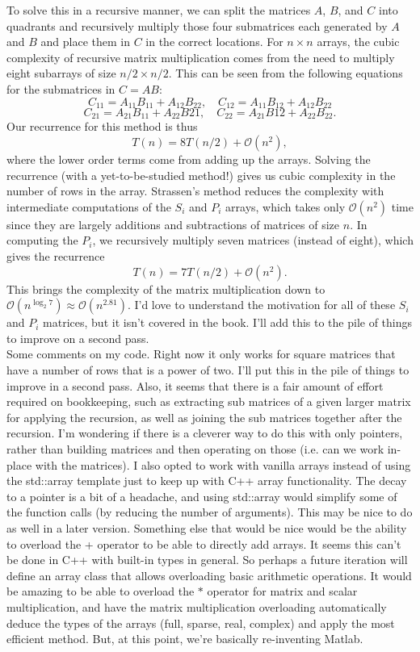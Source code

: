 \documentclass[12pt,english]{article}
\begin{document}
To solve this in a recursive manner, we can split the matrices $A$, $B$, and $C$ into quadrants and recursively multiply those four submatrices each generated by $A$ and $B$ and place them in $C$ in the correct locations.   For $n \times n$ arrays, the cubic complexity of recursive matrix multiplication comes from the need to multiply eight subarrays of size $n/2 \times n/2$.  This can be seen from the following equations for the submatrices in $C = AB$:
$$
C_{11} = A_{11}B_{11} + A_{12}B_{22}, \quad C_{12} = A_{11}B_{12} + A_{12}B_{22}
$$
$$
C_{21} = A_{21}B_{11} + A_{22}B{21}, \quad C_{22} = A_{21}B{12} + A_{22}B_{22}.
$$
Our recurrence for this method is thus
$$
T(n) = 8T(n/2) + \mathcal{O}(n^2),
$$
where the lower order terms come from adding up the arrays.  Solving the recurrence (with a yet-to-be-studied method!) gives us cubic complexity in the number of rows in the array.  Strassen's method reduces the complexity with intermediate computations of the $S_i$ and $P_i$ arrays, which takes only $\mathcal{O}(n^2)$ time since they are largely additions and subtractions of matrices of size $n$.  In computing the $P_i$, we recursively multiply seven matrices (instead of eight), which gives the recurrence
$$
T(n) = 7T(n/2) + \mathcal{O}(n^2).
$$
This brings the complexity of the matrix multiplication down to $\mathcal{O}(n^{\log_2 7}) \approx \mathcal{O}(n^{2.81})$.  I'd love to understand the motivation for all of these $S_i$ and $P_i$ matrices, but it isn't covered in the book.  I'll add this to the pile of things to improve on a second pass. \\

Some comments on my code.  Right now it only works for square matrices that have a number of rows that is a power of two.  I'll put this in the pile of things to improve in a second pass.  Also, it seems that there is a fair amount of effort required on bookkeeping, such as extracting sub matrices of a given larger matrix for applying the recursion, as well as joining the sub matrices together after the recursion.  I'm wondering if there is a cleverer way to do this with only pointers, rather than building matrices and then operating on those (i.e. can we work in-place with the matrices).  I also opted to work with vanilla arrays instead of using the std::array template just to keep up with C++ array functionality.  The decay to a pointer is a bit of a headache, and using std::array would simplify some of the function calls (by reducing the number of arguments).  This may be nice to do as well in a later version.  Something else that would be nice would be the ability to overload the + operator to be able to directly add arrays.  It seems this can't be done in C++ with built-in types in general.  So perhaps a future iteration will define an array class that allows overloading basic arithmetic operations.  It would be amazing to be able to overload the $*$ operator for matrix and scalar multiplication, and have the matrix multiplication overloading automatically deduce the types of the arrays (full, sparse, real, complex) and apply the most efficient method.  But, at this point, we're basically re-inventing Matlab.
\end{document}
